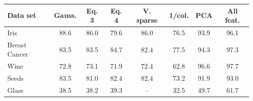 \begin{tabular}{@{}lccccccc@{}}
\toprule
Data set & Gauss. & Eq. 3 & Eq. 4 & V. sparse & 1/col. & PCA & All feat. \\
\midrule
Iris & 88.6 & 86.0 & 79.6 & 86.0 & 76.5 & 93.9 & 96.1 \\
Breast Cancer & 83.5 & 83.5 & 84.7 & 82.4 & 77.5 & 94.3 & 97.3 \\
Wine & 72.8 & 73.1 & 71.9 & 72.4 & 62.8 & 96.6 & 97.7 \\
Seeds & 83.5 & 81.0 & 82.4 & 82.4 & 73.2 & 91.9 & 93.0 \\
Glass & 38.5 & 38.2 & 39.3 & -- & 32.5 & 49.7 & 61.7 \\
\bottomrule
\end{tabular}
